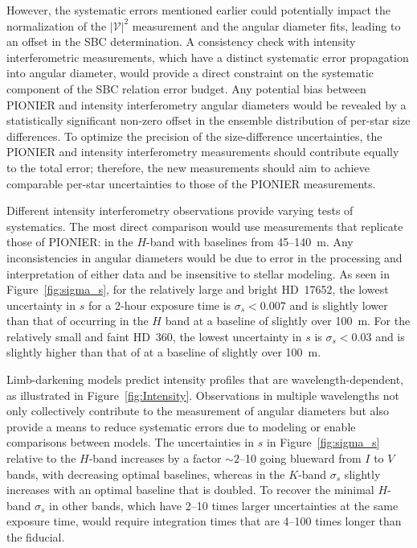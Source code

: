 \documentclass[linenumbers,trackchanges,margins]{aastex701}
\begin{document}
However, the systematic errors mentioned earlier could potentially impact the normalization of the  $|\mathcal{V}|^2$ measurement  and the angular diameter fits, leading to an offset in the SBC determination.
A consistency check with intensity interferometric measurements, which have a distinct systematic error propagation into angular diameter, would provide a direct constraint on the systematic component of the SBC relation error budget.
Any potential bias between PIONIER and intensity interferometry angular diameters would be revealed by a statistically significant non-zero offset in the ensemble distribution of per-star size differences. To optimize the precision of the size-difference uncertainties, the PIONIER and intensity interferometry measurements should contribute equally to the total error; therefore, the new measurements should aim to achieve comparable per-star uncertainties to those of the PIONIER measurements.

Different intensity interferometry observations  provide varying tests of systematics.
The most direct comparison would use measurements that replicate those of PIONIER: in the $H$-band with baselines from 45--140~m.  Any inconsistencies in angular diameters would be due
to  error in the processing and interpretation of either data and be insensitive to stellar modeling.
As seen in Figure~\ref{fig:sigma_s}, 
for the relatively large and bright HD~17652, the lowest uncertainty in $s$ for a 2-hour exposure time is $\sigma_s < 0.007$ and is slightly
lower than that of \citet{2018A&A...616A..68G} occurring in the $H$ band at a baseline of slightly over 100~m.   For the relatively small and faint HD~360,  the lowest uncertainty in $s$ is $\sigma_s < 0.03$ and is
slightly higher than that of \citet{2018A&A...616A..68G} at a baseline of slightly over 100~m. 

Limb-darkening models predict intensity profiles that are wavelength-dependent, as illustrated in  Figure~\ref{fig:Intensity}.   Observations in multiple wavelengths not only collectively contribute to the measurement of angular diameters but also provide a means to reduce systematic errors due to modeling or enable comparisons between models.
The uncertainties in $s$ in Figure~\ref{fig:sigma_s} relative to the $H$-band increases by a factor $\sim 2$--10
going blueward from $I$ to $V$ bands, with decreasing optimal baselines, whereas in the $K$-band  $\sigma_s$ slightly increases with an optimal baseline that is doubled.  To recover the minimal $H$-band $\sigma_s$ in other bands, which have
2--10 times larger uncertainties at the same exposure time, would require integration times that are
4--100 times longer than the fiducial.
\end{document}

